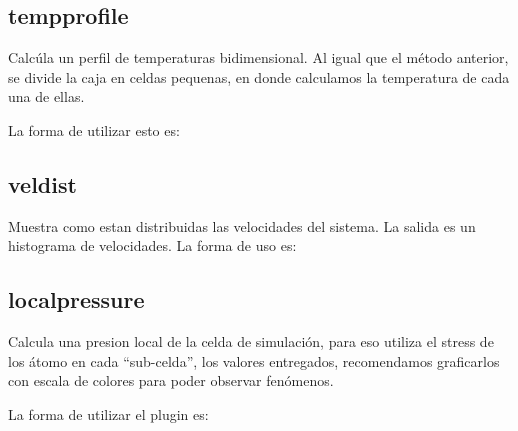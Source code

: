 \subsection{tempprofile}
Calc\'ula un perfil de temperaturas bidimensional. Al igual que el m\'etodo anterior, se divide la caja en celdas pequenas, en donde calculamos la temperatura de cada una de ellas.

La forma de utilizar esto es:


\subsection{veldist}
Muestra como estan distribuidas las velocidades del sistema. La salida es un histograma de velocidades. La forma de uso es:


\subsection{localpressure}

Calcula una presion local de la celda de simulaci\'on, para eso utiliza el stress de los \'atomo en cada ``sub-celda'', los valores entregados, recomendamos graficarlos con escala de colores para poder observar fen\'omenos. 

La forma de utilizar el plugin es:


